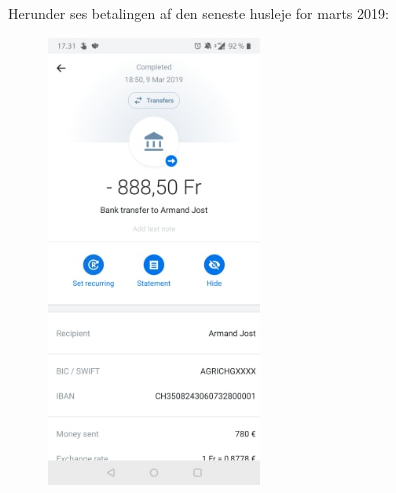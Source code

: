 \documentclass[../Ansoegning.tex]{subfiles}
\begin{document}
Herunder ses betalingen af den seneste husleje for marts 2019:
\begin{figure}[H]
	\centering
	\includegraphics[width=0.5\textwidth]{Eksterne_filer/trans.jpg}
\end{figure}
\end{document}
